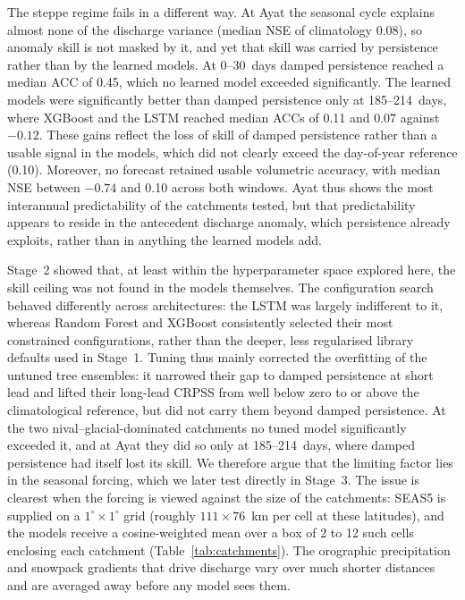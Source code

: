 \documentclass[review,12pt,authoryear]{elsarticle}
\begin{document}
The steppe regime fails in a different way. At Ayat the seasonal cycle explains almost none of the discharge variance (median NSE of climatology 0.08), so anomaly skill is not masked by it, and yet that skill was carried by persistence rather than by the learned models. At 0--30~days damped persistence reached a median ACC of 0.45, which no learned model exceeded significantly. The learned models were significantly better than damped persistence only at 185--214~days, where XGBoost and the LSTM reached median ACCs of 0.11 and 0.07 against $-0.12$. These gains reflect the loss of skill of damped persistence rather than a usable signal in the models, which did not clearly exceed the day-of-year reference (0.10). Moreover, no forecast retained usable volumetric accuracy, with median NSE between $-0.74$ and 0.10 across both windows. Ayat thus shows the most interannual predictability of the catchments tested, but that predictability appears to reside in the antecedent discharge anomaly, which persistence already exploits, rather than in anything the learned models add.

Stage~2 showed that, at least within the hyperparameter space explored here, the skill ceiling was not found in the models themselves. The configuration search behaved differently across architectures: the LSTM was largely indifferent to it, whereas Random Forest and XGBoost consistently selected their most constrained configurations, rather than the deeper, less regularised library defaults used in Stage~1. Tuning thus mainly corrected the overfitting of the untuned tree ensembles: it narrowed their gap to damped persistence at short lead and lifted their long-lead CRPSS from well below zero to or above the climatological reference, but did not carry them beyond damped persistence. At the two nival--glacial-dominated catchments no tuned model significantly exceeded it, and at Ayat they did so only at 185--214~days, where damped persistence had itself lost its skill. We therefore argue that the limiting factor lies in the seasonal forcing, which we later test directly in Stage~3. The issue is clearest when the forcing is viewed against the size of the catchments: SEAS5 is supplied on a $1^\circ\times1^\circ$ grid (roughly $111\times76$~km per cell at these latitudes), and the models receive a cosine-weighted mean over a box of 2 to 12 such cells enclosing each catchment (Table~\ref{tab:catchments}). The orographic precipitation and snowpack gradients that drive discharge vary over much shorter distances and are averaged away before any model sees them.
\end{document}
